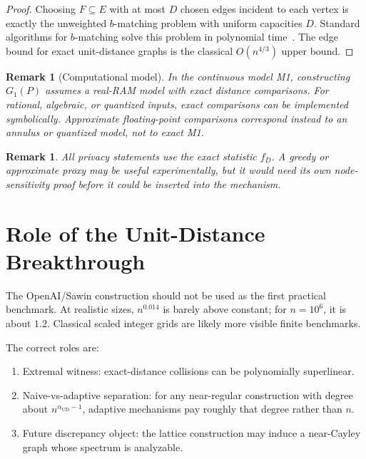 \documentclass[11pt]{article}
\newtheorem{remark}[theorem]{Remark}
\begin{document}
\begin{proof}
Choosing \(F\subseteq E\) with at most \(D\) chosen edges incident to each vertex is exactly the unweighted \(b\)-matching problem with uniform capacities \(D\). Standard algorithms for \(b\)-matching solve this problem in polynomial time~\cite{Schrijver03,Gabow18}. The edge bound for exact unit-distance graphs is the classical \(O(n^{4/3})\) upper bound.
\end{proof}

\begin{remark}[Computational model]
In the continuous model M1, constructing \(G_1(P)\) assumes a real-RAM model with exact distance comparisons. For rational, algebraic, or quantized inputs, exact comparisons can be implemented symbolically. Approximate floating-point comparisons correspond instead to an annulus or quantized model, not to exact M1.
\end{remark}

\begin{remark}
All privacy statements use the exact statistic \(f_D\). A greedy or approximate proxy may be useful experimentally, but it would need its own node-sensitivity proof before it could be inserted into the mechanism.
\end{remark}


\section{Role of the Unit-Distance Breakthrough}

The OpenAI/Sawin construction should not be used as the first practical benchmark. At realistic sizes, \(n^{0.014}\) is barely above constant; for \(n=10^6\), it is about \(1.2\). Classical scaled integer grids are likely more visible finite benchmarks.

The correct roles are:
\begin{enumerate}[leftmargin=*]
  \item Extremal witness: exact-distance collisions can be polynomially superlinear.
  \item Naive-vs-adaptive separation: for any near-regular construction with degree about \(n^{\alpha_{\mathrm{UD}}-1}\), adaptive mechanisms pay roughly that degree rather than \(n\).
  \item Future discrepancy object: the lattice construction may induce a near-Cayley graph whose spectrum is analyzable.
\end{enumerate}
\end{document}
